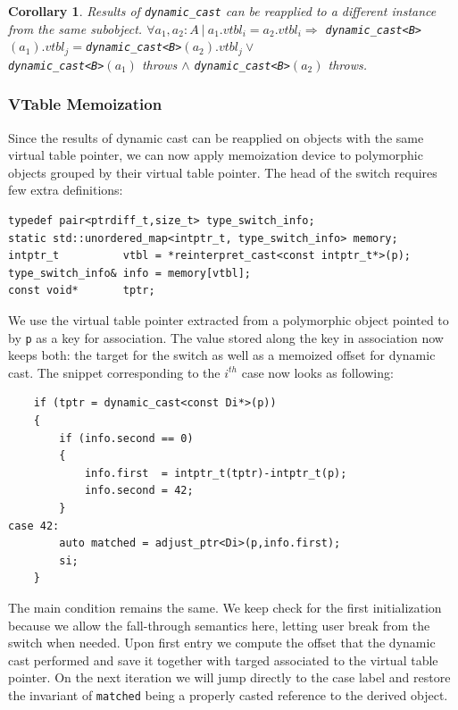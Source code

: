 \documentclass[preprint]{sigplanconf}
\makeatletter
\DeclareRobustCommand{\code}[1]{{\lstinline[breaklines=false,escapechar=@]{#1}}}
\newtheorem{corollary}{Corollary}
\makeatother
\begin{document}
\begin{corollary}
Results of \code{dynamic_cast} can be reapplied to a different instance from the same subobject.
$\forall a_1, a_2 : A\ |\ a_1.vtbl_i = a_2.vtbl_i \Rightarrow$
\code{dynamic_cast<B>}$(a_1).vtbl_j = $\code{dynamic_cast<B>}$(a_2).vtbl_j \vee$ \\
\code{dynamic_cast<B>}$(a_1)$ throws $\wedge$ \code{dynamic_cast<B>}$(a_2)$ 
throws.
\end{corollary}

\subsubsection{VTable Memoization}
\label{sec:vtblmem}

Since the results of dynamic cast can be reapplied on objects with the same 
virtual table pointer, we can now apply memoization device to polymorphic 
objects grouped by their virtual table pointer. The head of the switch requires 
few extra definitions:

\begin{lstlisting}
typedef pair<ptrdiff_t,size_t> type_switch_info;
static std::unordered_map<intptr_t, type_switch_info> memory;
intptr_t          vtbl = *reinterpret_cast<const intptr_t*>(p);
type_switch_info& info = memory[vtbl];
const void*       tptr; 
\end{lstlisting}

We use the virtual table pointer extracted from a polymorphic object pointed to 
by \code{p} as a key for association. The value stored along the key in 
association now keeps both: the target for the switch as well as a memoized 
offset for dynamic cast. The snippet corresponding to the $i^{th}$ case now 
looks as following:

\begin{lstlisting}
    if (tptr = dynamic_cast<const Di*>(p))
    {
        if (info.second == 0)
        {
            info.first  = intptr_t(tptr)-intptr_t(p);
            info.second = 42;
        }
case 42:
        auto matched = adjust_ptr<Di>(p,info.first); 
        si;
    }
\end{lstlisting}

\noindent
The main condition remains the same. We keep check for the first initialization 
because we allow the fall-through semantics here, letting user break from the 
switch when needed. Upon first entry we compute the offset that the dynamic cast 
performed and save it together with targed associated to the virtual table 
pointer. On the next iteration we will jump directly to the case label and 
restore the invariant of \code{matched} being a properly casted reference to the 
derived object.
\end{document}
